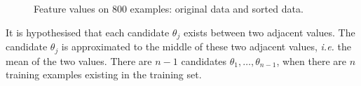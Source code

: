 \begin{figure}[ht]
 \begin{center}
  \caption{Feature values on $800$ examples: original data and sorted data.}
 \end{center}
\end{figure}  
It is hypothesised that each candidate $\theta_j$ exists between two adjacent values. The candidate $\theta_j$ is approximated to the middle of these two adjacent values, \textit{i.e.} the mean of the two values. There are $n-1$ candidates $\theta_{1},\ldots,\theta_{n-1}$, when there are $n$ training examples existing in the training set.
